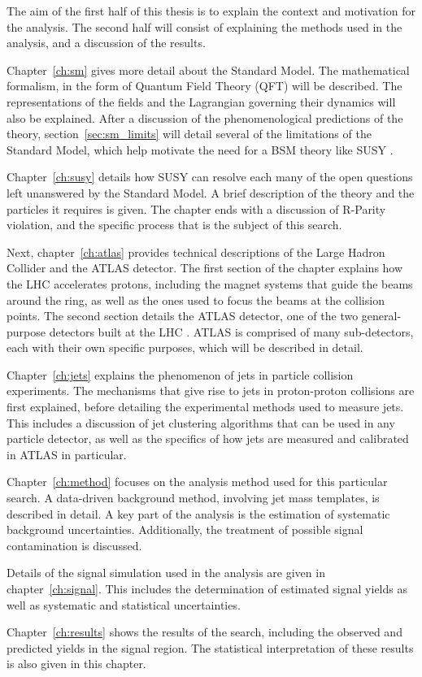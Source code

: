 The aim of the first half of this thesis is to explain the context and motivation for the analysis.
The second half will consist of explaining the methods used in the analysis, and a discussion of the results.

Chapter~\ref{ch:sm} gives more detail about the Standard Model.
The mathematical formalism, in the form of Quantum Field Theory (QFT) will be described.
The representations of the fields and the Lagrangian governing their dynamics will also be explained.
After a discussion of the phenomenological predictions of the theory, section~\ref{sec:sm_limits} will detail
several of the limitations of the Standard Model, which help motivate the need for a BSM theory like SUSY .

Chapter~\ref{ch:susy} details how SUSY can resolve each many of the open questions left unanswered by the Standard Model.
A brief description of the theory and the particles it requires is given.
The chapter ends with a discussion of R-Parity violation, and the specific process that is the subject of this search.

Next, chapter~\ref{ch:atlas} provides technical descriptions of the Large Hadron Collider and the ATLAS detector.
The first section of the chapter explains how the LHC accelerates protons, including the magnet systems that guide the beams
around the ring, as well as the ones used to focus the beams at the collision points.
The second section details the ATLAS detector, one of the two general-purpose detectors built at the LHC .
ATLAS is comprised of many sub-detectors, each with their own specific purposes, which will be described in detail.

Chapter~\ref{ch:jets} explains the phenomenon of jets in particle collision experiments.
The mechanisms that give rise to jets in proton-proton collisions are first explained,
before detailing the experimental methods used to measure jets.
This includes a discussion of jet clustering algorithms that can be used in any particle detector,
as well as the specifics of how jets are measured and calibrated in ATLAS in particular.

Chapter~\ref{ch:method} focuses on the analysis method used for this particular search.
A data-driven background method, involving jet mass templates, is described in detail.
A key part of the analysis is the estimation of systematic background uncertainties.
Additionally, the treatment of possible signal contamination is discussed.

Details of the signal simulation used in the analysis are given in chapter~\ref{ch:signal}.
This includes the determination of estimated signal yields as well as systematic and statistical uncertainties.

Chapter~\ref{ch:results} shows the results of the search, including the observed and predicted yields in the signal region.
The statistical interpretation of these results is also given in this chapter.